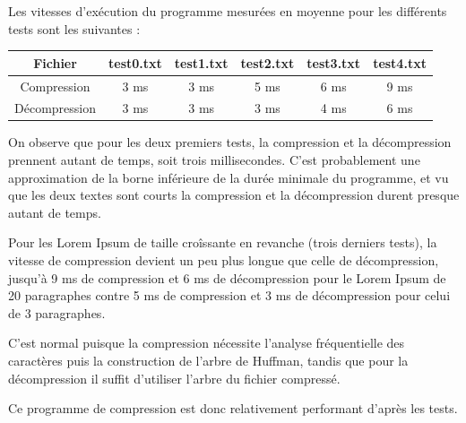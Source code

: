 \documentclass [a4paper,11pt] {report}
\begin{document}
Les vitesses d'exécution du programme mesurées en moyenne pour les différents tests sont les suivantes :
\begin{center}
\begin{tabular}{|c|c|c|c|c|c|}
 \hline
Fichier & test0.txt & test1.txt & test2.txt & test3.txt & test4.txt\\
 \hline
Compression & 3 ms & 3 ms & 5 ms & 6 ms & 9 ms\\
Décompression & 3 ms & 3 ms & 3 ms & 4 ms & 6 ms\\
 \hline
\end{tabular}
\end{center}
\vspace{0.25cm}

On observe que pour les deux premiers tests, la compression et la décompression prennent autant de temps, soit trois millisecondes. C'est probablement une approximation de la borne inférieure de la durée minimale du programme, et vu que les deux textes sont courts la compression et la décompression durent presque autant de temps.

Pour les Lorem Ipsum de taille croîssante en revanche (trois derniers tests), la vitesse de compression devient un peu plus longue que celle de décompression, jusqu'à 9 ms de compression et 6 ms de décompression pour le Lorem Ipsum de 20 paragraphes contre 5 ms de compression et 3 ms de décompression pour celui de 3 paragraphes.

C'est normal puisque la compression nécessite l'analyse fréquentielle des caractères puis la construction de l'arbre de Huffman, tandis que pour la décompression il suffit d'utiliser l'arbre du fichier compressé.

Ce programme de compression est donc relativement performant d'après les tests.
\end{document}
